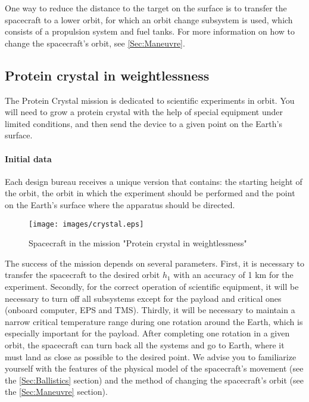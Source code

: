 \documentclass[12pt,a4paper]{article}
\begin{document}
One way to reduce the distance to the target on the surface is to transfer the spacecraft to a lower orbit, for which an orbit change subsystem is used, which consists of a propulsion system and fuel tanks. For more information on how to change the spacecraft's orbit, see \ref{Sec:Maneuvre}.

\clearpage
\subsection{Protein crystal in weightlessness}

The Protein Crystal mission is dedicated to scientific experiments in orbit. You will need to grow a protein crystal with the help of special equipment under limited conditions, and then send the device to a given point on the Earth's surface.

\paragraph{Initial data}

Each design bureau receives a unique version that contains: the starting height of the orbit, the orbit in which the experiment should be performed and the point on the Earth's surface where the apparatus should be directed.
\begin{figure}[tbh]
  \begin{center}
    \texttt{[image: images/crystal.eps]}
    \caption{Spacecraft in the mission "Protein crystal in weightlessness"}
    \label{Pic:SMS}
  \end{center}
\end{figure}

The success of the mission depends on several parameters. First, it is necessary to transfer the spacecraft to the desired orbit $h_1$ with an accuracy of 1 km for the experiment. Secondly, for the correct operation of scientific equipment, it will be necessary to turn off all subsystems except for the payload and critical ones (onboard computer, EPS and TMS). Thirdly, it will be necessary to maintain a narrow critical temperature range during one rotation around the Earth, which is especially important for the payload. After completing one rotation in a given orbit, the spacecraft can turn back all the systems and go to Earth, where it must land as close as possible to the desired point. We advise you to familiarize yourself with the features of the physical model of the spacecraft's movement (see the \ref{Sec:Ballistics} section) and the method of changing the spacecraft's orbit (see the \ref{Sec:Maneuvre} section).
\end{document}
